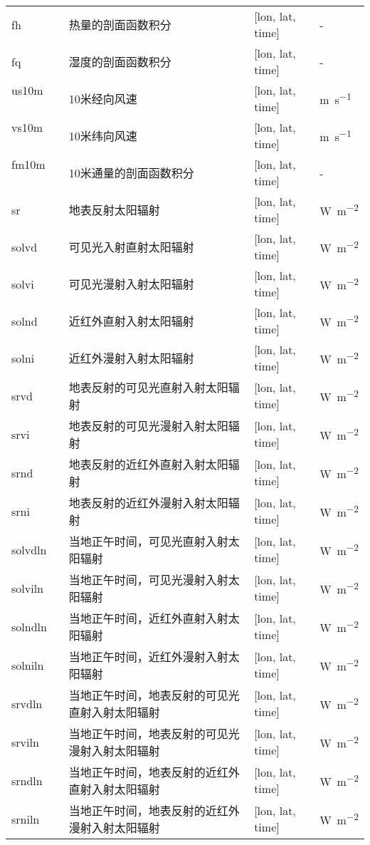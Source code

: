 \documentclass[a4paper,12pt,twoside]{article}
\begin{document}
\begin{longtable}[htbp]{lp{}p{}l}
fh ~ ~ ~ & 热量的剖面函数积分 & {[}lon, lat, time{]}  & - \\
fq ~ ~ ~ & 湿度的剖面函数积分 & {[}lon, lat, time{]}  & - \\
us10m~ ~ & 10米经向风速 & {[}lon, lat, time{]}  & \unit{m.s^{-1}} \\
vs10m~ ~ & 10米纬向风速 & {[}lon, lat, time{]}  & \unit{m.s^{-1}} \\
fm10m~ ~ & 10米通量的剖面函数积分 & {[}lon, lat, time{]}  & - \\
sr ~ ~ ~ & 地表反射太阳辐射 & {[}lon, lat, time{]}  & \unit{W.m^{-2}} \\
solvd~ ~ & 可见光入射直射太阳辐射 & {[}lon, lat, time{]}  & \unit{W.m^{-2}} \\
solvi~ ~ & 可见光漫射入射太阳辐射 & {[}lon, lat, time{]}  & \unit{W.m^{-2}} \\
solnd~ ~ & 近红外直射入射太阳辐射 & {[}lon, lat, time{]}  & \unit{W.m^{-2}} \\
solni~ ~ & 近红外漫射入射太阳辐射 & {[}lon, lat, time{]}  & \unit{W.m^{-2}} \\
srvd ~ ~ & 地表反射的可见光直射入射太阳辐射 & {[}lon, lat, time{]}  & \unit{W.m^{-2}} \\
srvi ~ ~ & 地表反射的可见光漫射入射太阳辐射 & {[}lon, lat, time{]}  & \unit{W.m^{-2}} \\
srnd ~ & 地表反射的近红外直射入射太阳辐射 & {[}lon, lat, time{]}  & \unit{W.m^{-2}} \\
srni ~ & 地表反射的近红外漫射入射太阳辐射 & {[}lon, lat, time{]}  & \unit{W.m^{-2}} \\
solvdln~ & 当地正午时间，可见光直射入射太阳辐射 & {[}lon, lat,
time{]}  & \unit{W.m^{-2}} \\
solviln~ & 当地正午时间，可见光漫射入射太阳辐射 & {[}lon, lat,
time{]}  & \unit{W.m^{-2}} \\
solndln~ & 当地正午时间，近红外直射入射太阳辐射 & {[}lon, lat,
time{]}  & \unit{W.m^{-2}} \\
solniln~ & 当地正午时间，近红外漫射入射太阳辐射 & {[}lon, lat,
time{]}  & \unit{W.m^{-2}} \\
srvdln ~ & 当地正午时间，地表反射的可见光直射入射太阳辐射 & {[}lon, lat,
time{]}  & \unit{W.m^{-2}} \\
srviln ~ & 当地正午时间，地表反射的可见光漫射入射太阳辐射 & {[}lon, lat,
time{]}  & \unit{W.m^{-2}} \\
srndln ~ & 当地正午时间，地表反射的近红外直射入射太阳辐射 & {[}lon, lat,
time{]}  & \unit{W.m^{-2}} \\
srniln~ & 当地正午时间，地表反射的近红外漫射入射太阳辐射 & {[}lon, lat,
time{]}  & \unit{W.m^{-2}} \\

\end{longtable}
\end{document}
